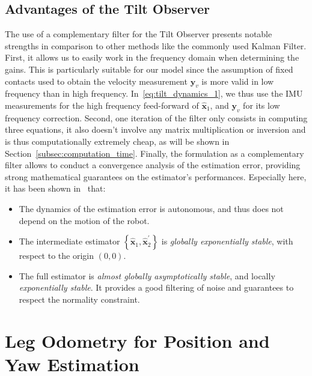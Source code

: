 \documentclass{IJCAS}
\begin{document}
\subsection{Advantages of the Tilt Observer}
The use of a complementary filter for the Tilt Observer presents notable strengths in comparison to other methods like the commonly used Kalman Filter. First, it allows us to easily work in the frequency domain when determining the gains. This is particularly suitable for our model since the assumption of fixed contacts used to obtain the velocity measurement $\boldsymbol{y}_v$ is more valid in low frequency than in high frequency. In~\eqref{eq:tilt_dynamics_1}, we thus use the IMU measurements for the high frequency feed-forward of $\hat{\boldsymbol{x}}_{1}$, and $\boldsymbol{y}_v$ for its low frequency correction. Second, one iteration of the filter only consists in computing three equations, it also doesn't involve any matrix multiplication or inversion and is thus computationally extremely cheap, as will be shown in Section~\ref{subsec:computation_time}. Finally, the formulation as a complementary filter allows to conduct a convergence analysis of the estimation error, providing strong mathematical guarantees on the estimator's performances. Especially here, it has been shown in~\cite{benallegue2020LyapunovStableOrientationEstimatorHumanoids} that:
\begin{itemize}
    \item The dynamics of the estimation error is autonomous, and thus does not depend on the motion of the robot. 
    \item The intermediate estimator $\left\{\hat{\boldsymbol{x}}_{1}, \hat{\boldsymbol{x}}_{2}^{\prime} \right\}$ is \emph{globally exponentially stable}, with respect to the origin $\left(0,0\right)$.
    \item The full estimator is \emph{almost globally asymptotically stable}, and locally \emph{exponentially stable}. It provides a good filtering of noise and guarantees to respect the normality constraint.
\end{itemize}

\section{Leg Odometry for Position and Yaw Estimation} \label{sec:leg_odometry}
\end{document}
